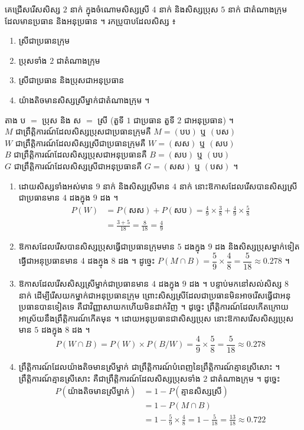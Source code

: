 \begin{example}[លំហាត់គំរូ ២]
គេជ្រើសរើសសិស្ស $2$ នាក់ ក្នុងចំណោមសិស្សស្រី $4$ នាក់ និងសិស្សប្រុស $5$ នាក់ ជាតំណាងក្រុមដែលមានប្រធាន និងអនុប្រធាន ។ រកប្រូបាបដែលសិស្ស ៖
\begin{enumerate}[a]
  \item ស្រីជាប្រធានក្រុម
  \item ប្រុសទាំង $2$ ជាតំណាងក្រុម
  \item ស្រីជាប្រធាន និងប្រុសជាអនុប្រធាន
  \item យ៉ាងតិចមានសិស្សស្រីម្នាក់ជាតំណាងក្រុម ។
\end{enumerate}
\ans
តាង ប $=$ ប្រុស និង ស $=$ ស្រី (តួទី $1$ ជាប្រធាន តួទី $2$ ជាអនុប្រធាន) ។\\
$M$ ជាព្រឹត្តិការណ៍ដែលសិស្សប្រុសជាប្រធានក្រុមគឺ $M = (\text{បប})$ ឬ $(\text{បស})$\\
$W$ ជាព្រឹត្តិការណ៍ដែលសិស្សស្រីជាប្រធានក្រុមគឺ $W = (\text{សស})$ ឬ $(\text{សប})$\\
$B$ ជាព្រឹត្តិការណ៍ដែលសិស្សប្រុសជាអនុប្រធានគឺ $B = (\text{សប})$ ឬ $(\text{បប})$\\
$G$ ជាព្រឹត្តិការណ៍ដែលសិស្សស្រីជាអនុប្រធានគឺ $G = (\text{សស})$ ឬ $(\text{បស})$ ។
\begin{enumerate}[a]
  \item ដោយសិស្សទាំងអស់មាន $9$ នាក់ និងសិស្សស្រីមាន $4$ នាក់ នោះឱកាសដែលរើសបានសិស្សស្រីជាប្រធានមាន $4$ ដងក្នុង $9$ ដង ។
  \[
  \begin{aligned}
  P(W) &= P(\text{សស}) + P(\text{សប}) = \frac{4}{9}\times\frac{3}{8} + \frac{4}{9}\times\frac{5}{8}\\
  &= \frac{3 + 5}{18} = \frac{8}{18} = \frac{4}{9}
  \end{aligned}
  \]
  \item ឱកាសដែលរើសបានសិស្សប្រុសធ្វើជាប្រធានក្រុមមាន $5$ ដងក្នុង $9$ ដង និងសិស្សប្រុសម្នាក់ទៀតធ្វើជាអនុប្រធានមាន $4$ ដងក្នុង $8$ ដង ។ ដូច្នេះ $P(M \cap B) = \dfrac{5}{9}\times\dfrac{4}{8} = \dfrac{5}{18} \approx 0.278$ ។
  \item ឱកាសដែលរើសសិស្សស្រីម្នាក់ជាប្រធានមាន $4$ ដងក្នុង $9$ ដង ។ បន្ទាប់មកនៅសល់សិស្ស $8$ នាក់ ដើម្បីរើសយកម្នាក់ជាអនុប្រធានក្រុម ព្រោះសិស្សស្រីដែលជាប្រធានមិនអាចរើសធ្វើជាអនុប្រធានបានទៀតទេ គឺជាវិញ្ញាសាយកហើយមិនដាក់វិញ ។ ដូច្នេះ ព្រឹត្តិការណ៍ដែលកើតក្រោយអាស្រ័យនឹងព្រឹត្តិការណ៍កើតមុន ។ ដោយអនុប្រធានជាសិស្សប្រុស នោះឱកាសរើសសិស្សប្រុសមាន $5$ ដងក្នុង $8$ ដង ។
  \[
  P(W \cap B) = P(W)\times P(B/W) = \frac{4}{9}\times\frac{5}{8} = \frac{5}{18} \approx 0.278
  \]
  \item ព្រឹត្តិការណ៍ដែលយ៉ាងតិចមានស្រីម្នាក់ ជាព្រឹត្តិការណ៍បំពេញនៃព្រឹត្តិការណ៍គ្មានស្រីសោះ ។ ព្រឹត្តិការណ៍គ្មានស្រីសោះ គឺជាព្រឹត្តិការណ៍ដែលសិស្សប្រុសទាំង $2$ ជាតំណាងក្រុម ។ ដូច្នេះ
  \[
  \begin{aligned}
P(\text{យ៉ាងតិចមានស្រីម្នាក់}) &= 1 - P(\text{គ្មានសិស្សស្រី})\\
&= 1 - P(M \cap B)\\
&= 1 - \frac{5}{9}\times\frac{4}{8} = 1 - \frac{5}{18} = \frac{13}{18} \approx 0.722
\end{aligned}
  \]
\end{enumerate}
\end{example}

